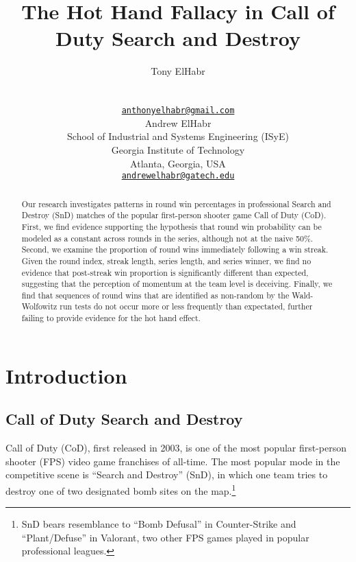 \documentclass{article}
\title{The Hot Hand Fallacy in Call of Duty Search and Destroy}
\author{
    Tony ElHabr
   \\
     \\
   \\
  \texttt{\href{mailto:anthonyelhabr@gmail.com}{\nolinkurl{anthonyelhabr@gmail.com}}} \\
   \And
    Andrew ElHabr
   \\
    School of Industrial and Systems Engineering (ISyE) \\
    Georgia Institute of Technology \\
  Atlanta, Georgia, USA \\
  \texttt{\href{mailto:andrewelhabr@gatech.edu}{\nolinkurl{andrewelhabr@gatech.edu}}} \\
  }
\begin{document}
\maketitle


\begin{abstract}
Our research investigates patterns in round win percentages in
professional Search and Destroy (SnD) matches of the popular
first-person shooter game Call of Duty (CoD). First, we find evidence
supporting the hypothesis that round win probability can be modeled as a
constant across rounds in the series, although not at the naive 50\%.
Second, we examine the proportion of round wins immediately following a
win streak. Given the round index, streak length, series length, and
series winner, we find no evidence that post-streak win proportion is
significantly different than expected, suggesting that the perception of
momentum at the team level is deceiving. Finally, we find that sequences
of round wins that are identified as non-random by the Wald-Wolfowitz
run tests do not occur more or less frequently than expectated, further
failing to provide evidence for the hot hand effect.
\end{abstract}


\hypertarget{introduction}{%
\section{Introduction}\label{introduction}}

\hypertarget{call-of-duty-search-and-destroy}{%
\subsection{Call of Duty Search and
Destroy}\label{call-of-duty-search-and-destroy}}

Call of Duty (CoD), first released in 2003, is one of the most popular
first-person shooter (FPS) video game franchises of all-time. The most
popular mode in the competitive scene is ``Search and Destroy'' (SnD),
in which one team tries to destroy one of two designated bomb sites on
the map.\footnote{SnD bears resemblance to ``Bomb Defusal'' in
  Counter-Strike and ``Plant/Defuse'' in Valorant, two other FPS games
  played in popular professional leagues.}
\end{document}
